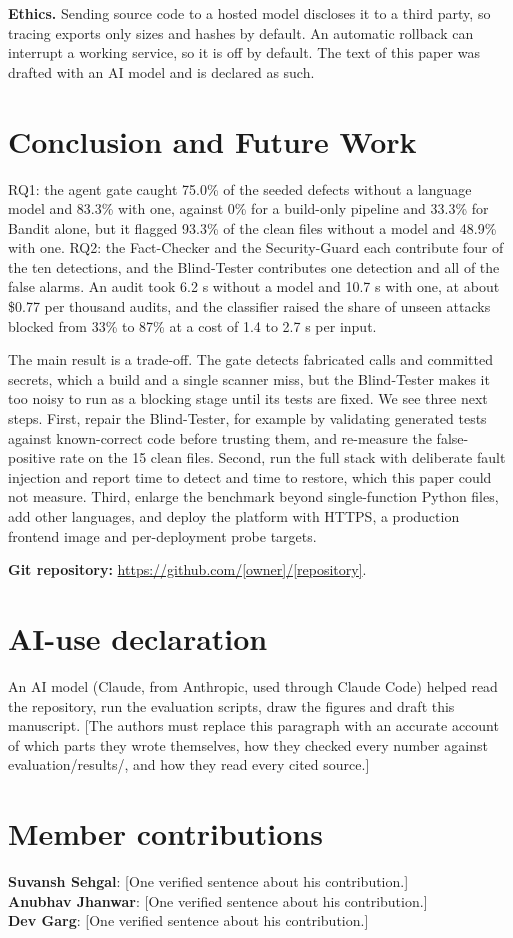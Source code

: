 \documentclass[12pt,onecolumn,draftclsnofoot]{IEEEtran}
\begin{document}
\textbf{Ethics.} Sending source code to a hosted model discloses it to a third party, so tracing exports only sizes and hashes by default. An automatic rollback can interrupt a working service, so it is off by default. The text of this paper was drafted with an AI model and is declared as such.

\section{Conclusion and Future Work}
RQ1: the agent gate caught 75.0\% of the seeded defects without a language model and 83.3\% with one, against 0\% for a build-only pipeline and 33.3\% for Bandit alone, but it flagged 93.3\% of the clean files without a model and 48.9\% with one. RQ2: the Fact-Checker and the Security-Guard each contribute four of the ten detections, and the Blind-Tester contributes one detection and all of the false alarms. An audit took 6.2 s without a model and 10.7 s with one, at about \$0.77 per thousand audits, and the classifier raised the share of unseen attacks blocked from 33\% to 87\% at a cost of 1.4 to 2.7 s per input.

The main result is a trade-off. The gate detects fabricated calls and committed secrets, which a build and a single scanner miss, but the Blind-Tester makes it too noisy to run as a blocking stage until its tests are fixed. We see three next steps. First, repair the Blind-Tester, for example by validating generated tests against known-correct code before trusting them, and re-measure the false-positive rate on the 15 clean files. Second, run the full stack with deliberate fault injection and report time to detect and time to restore, which this paper could not measure. Third, enlarge the benchmark beyond single-function Python files, add other languages, and deploy the platform with HTTPS, a production frontend image and per-deployment probe targets.

\noindent\textbf{Git repository:} \url{https://github.com/[owner]/[repository]}.

\section*{AI-use declaration}
An AI model (Claude, from Anthropic, used through Claude Code) helped read the repository, run the evaluation scripts, draw the figures and draft this manuscript. [The authors must replace this paragraph with an accurate account of which parts they wrote themselves, how they checked every number against evaluation/results/, and how they read every cited source.]

\section*{Member contributions}
\noindent\textbf{Suvansh Sehgal}: [One verified sentence about his contribution.]\\
\textbf{Anubhav Jhanwar}: [One verified sentence about his contribution.]\\
\textbf{Dev Garg}: [One verified sentence about his contribution.]



\end{document}
